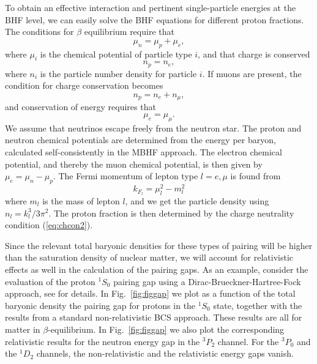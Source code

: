 \documentclass[rmp,preprint,aps,floatfix]{revtex4}
\begin{document}
To obtain an effective interaction and pertinent single-particle
energies at the BHF level, we can easily solve
the BHF equations 
for different proton fractions.
The conditions for $\beta$ equilibrium require
that 
\begin{equation}
     \mu_{n}=\mu_{p}+\mu_{e},
\end{equation}
where $\mu_i$ is the chemical potential of particle type $i$, 
and that charge is conserved
\begin{equation}
     n_{p}=n_{e},
\end{equation}
where $n_{i}$ is the particle number density for particle $i$.  If 
muons are present, the condition for charge conservation becomes 
\begin{equation}
n_{p}=n_{e}+n_{\mu},
\label{eq:chcon2}
\end{equation}
and conservation of energy requires that 
\begin{equation}
\mu_{e}=\mu_{\mu}.
\end{equation}
We assume that neutrinos escape freely from the neutron star.  
The proton and neutron chemical potentials are determined from the 
energy per baryon, calculated self-consistently in the MBHF approach.  
The electron chemical potential, and thereby the muon chemical potential, 
is then given by $\mu_{e}=\mu_{n}-\mu_{p}$.  The Fermi momentum of lepton 
type $l=e,\mu$ is found from 
\begin{equation}
k_{F_{l}}=\mu_{l}^{2}-m_{l}^{2}
\end{equation}
where $m_{l}$ is the mass of lepton $l$, and we get the particle density 
using $n_{l}=k_{l}^{3}/3\pi^{2}$.  The proton fraction is then determined 
by the charge neutrality condition (\ref{eq:chcon2}).



Since the relevant total baryonic densities for these types of
pairing will be higher than the saturation
density of nuclear matter, we will account for relativistic
effects as well in the calculation of the pairing gaps.
As an example, consider the evaluation of the proton
$^1S_0$ pairing gap using a Dirac-Brueckner-Hartree-Fock  approach,
see \cite{elga96,pair1} for details.
In Fig.\ \ref{fig:figgap} we plot as a function of the total baryonic 
density the pairing gap for protons in the $^1S_0$
state, together with the results from a standard non-relativistic 
BCS approach.
These results are all 
for matter in $\beta$-equilibrium. In Fig.\ \ref{fig:figgap} 
we also plot the 
corresponding relativistic 
results for the neutron energy gap in the $^3P_2$ channel. 
For the 
$^3P_0$ and the $^1D_2$ channels,
the non-relativistic and the relativistic
energy gaps vanish. 
\end{document}
